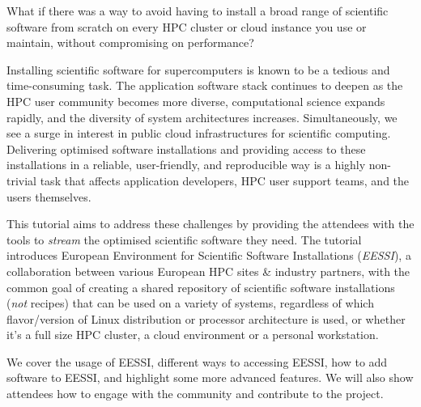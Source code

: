 What if there was a way to avoid having to install a broad range of scientific software from scratch on every HPC
cluster or cloud instance you use or maintain, without compromising on performance?

Installing scientific software for supercomputers is known to be a tedious and time-consuming task. The application
software stack continues to deepen as the
HPC user community becomes more diverse, computational science expands rapidly, and the diversity of system architectures
increases. Simultaneously, we see a surge in interest in public cloud
infrastructures for scientific computing. Delivering optimised software installations and providing access to these
installations in a reliable, user-friendly, and reproducible way is a highly non-trivial task that affects application
developers, HPC user support teams, and the users themselves.

This tutorial aims to address these challenges by providing the attendees with the tools to \emph{stream} the optimised
scientific software they need. The tutorial introduces European Environment for Scientific Software Installations
(\emph{EESSI}), a collaboration between various European HPC sites \& industry partners, with the common goal of
creating a shared repository of scientific software installations (\emph{not} recipes) that can be used on a variety of
systems, regardless
of which flavor/version of Linux distribution or processor architecture is used, or whether it's a full size HPC
cluster, a cloud environment or a personal workstation.

We cover the usage of EESSI, different ways to accessing EESSI, how to add software to EESSI, and highlight some more 
advanced features. We will also show attendees how to engage with the community and contribute to the project.
